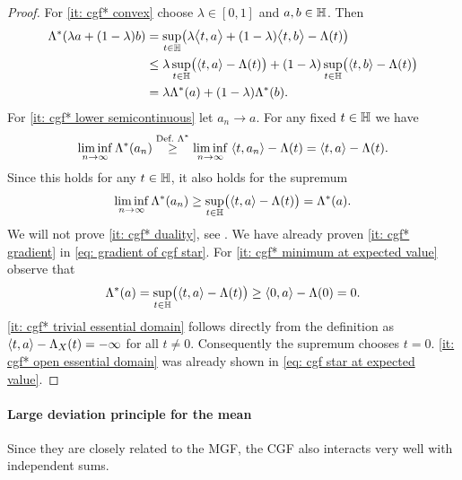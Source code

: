 \begin{proof}
    For \ref{it: cgf* convex} choose \(\lambda\in [0,1]\) and \(a, b\in \hilbert\). Then
    \[\begin{aligned}
        \Lambda^*(\lambda a + (1-\lambda) b)
        &= \sup_{t\in \hilbert} \bigl(\lambda \scp[\big]{t, a} + (1-\lambda) \scp[\big]{t, b} - \Lambda(t)\bigr)
        \\
        &\le \lambda \sup_{t\in \hilbert} \bigl(\scp{t, a} - \Lambda(t)\bigr)
        + (1-\lambda) \sup_{t\in \hilbert} \bigl(\scp{t, b} - \Lambda(t)\bigr)
        \\
        &= \lambda \Lambda^*(a) + (1-\lambda) \Lambda^*(b).
    \end{aligned}
    \]
    For \ref{it: cgf* lower semicontinuous} let \(a_n \to a\). For any fixed \(t\in \hilbert\) we have
    \[
        \liminf_{n\to \infty} \Lambda^*(a_n)
        \overset{\text{Def.~}\Lambda^*}\ge \liminf_{n\to \infty}\; \scp{t, a_n} - \Lambda(t)
        = \scp{t, a} - \Lambda(t).
    \]
    Since this holds for any \(t\in \hilbert\), it also holds for the supremum
    \[
        \liminf_{n\to \infty} \Lambda^*(a_n) \ge \sup_{t\in \hilbert} \bigl(\scp{t, a} - \Lambda(t)\bigr) = \Lambda^*(a).
    \]
    We will not prove \ref{it: cgf* duality}, see \citep[Lemma 4.5.8]{demboLargeDeviationsTechniques2009}. We have already proven
    \ref{it: cgf* gradient} in \eqref{eq: gradient of cgf star}. For \ref{it: cgf* minimum at expected value} observe that
    \[
        \Lambda^*(a) = \sup_{t\in \hilbert} \bigl(\scp{t, a} - \Lambda(t)\bigr)
        \ge \scp{0, a} - \Lambda(0) = 0.
    \]
    \ref{it: cgf* trivial essential domain} follows directly from the definition
    as \(\scp{t, a} - \CGF_X(t) = -\infty\) for all \(t \neq 0\). Consequently
    the supremum chooses \(t=0\).  \ref{it: cgf* open essential domain} was already
    shown in \eqref{eq: cgf star at expected value}.
\end{proof}

\paragraph*{Large deviation principle for the mean}

Since they are closely related to the MGF, the CGF also interacts very well with
independent sums.

